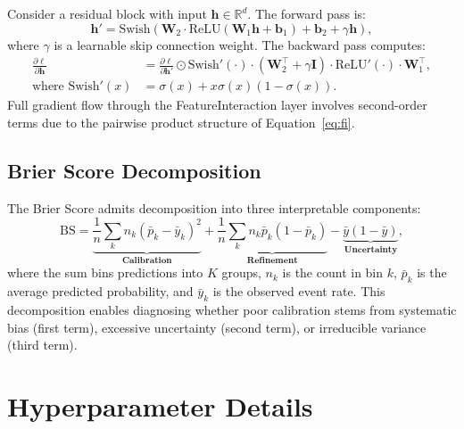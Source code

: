 \documentclass[12pt, a4paper]{article}
\begin{document}
Consider a residual block with input $\mathbf{h} \in \mathbb{R}^d$. The forward pass is:
\begin{equation}
\mathbf{h}' = \text{Swish}\left( \mathbf{W}_2 \cdot \text{ReLU}(\mathbf{W}_1 \mathbf{h} + \mathbf{b}_1) + \mathbf{b}_2 + \gamma \mathbf{h} \right),
\end{equation}
where $\gamma$ is a learnable skip connection weight. The backward pass computes:
\begin{align}
\frac{\partial \ell}{\partial \mathbf{h}} &= \frac{\partial \ell}{\partial \mathbf{h}'} \odot \text{Swish}'(\cdot) \cdot \left( \mathbf{W}_2^\top + \gamma \mathbf{I} \right) \cdot \text{ReLU}'(\cdot) \cdot \mathbf{W}_1^\top, \\
\text{where } \text{Swish}'(x) &= \sigma(x) + x \sigma(x)(1 - \sigma(x)).
\end{align}
Full gradient flow through the FeatureInteraction layer involves second-order terms due to the pairwise product structure of Equation~\eqref{eq:fi}.

\subsection{Brier Score Decomposition}

The Brier Score admits decomposition into three interpretable components:
\begin{equation}
\text{BS} = \underbrace{\frac{1}{n}\sum_k n_k (\bar{p}_k - \bar{y}_k)^2}_{\textbf{Calibration}} 
+ \underbrace{\frac{1}{n}\sum_k n_k \bar{p}_k(1-\bar{p}_k)}_{\textbf{Refinement}} 
- \underbrace{\bar{y}(1-\bar{y})}_{\textbf{Uncertainty}},
\end{equation}
where the sum bins predictions into $K$ groups, $n_k$ is the count in bin $k$, $\bar{p}_k$ is the average predicted probability, and $\bar{y}_k$ is the observed event rate. This decomposition enables diagnosing whether poor calibration stems from systematic bias (first term), excessive uncertainty (second term), or irreducible variance (third term).


\section{Hyperparameter Details}\label{app:hparams}
\end{document}
